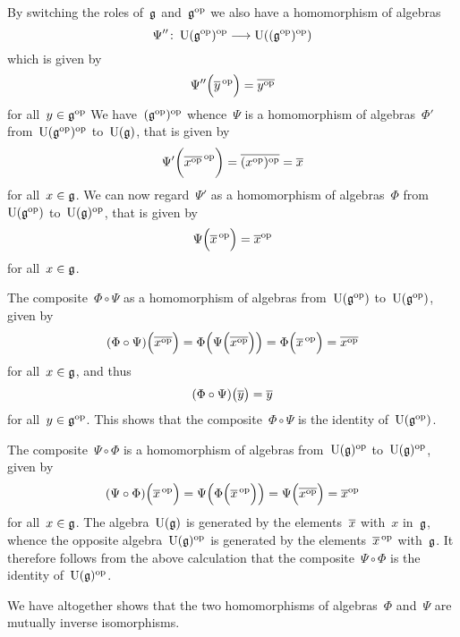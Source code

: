 \begin{example}
  By switching the roles of~$\mathfrak{g}$ and~$\mathfrak{g}^{\mathrm{op}}$ we also have a homomorphism of algebras
  \[
    \Psi''
    \colon
    \Univ(\glie^{\op})^{\op}
    \to
    \Univ( (\glie^{\op})^{\op} )
  \]
  which is given by
  \[
    \Psi''\Bigl( \overline{y}^{\,\mathrm{op}} \Bigr)
    =
    \overline{ y^{\mathrm{op}} }
  \]
  for all~$y \in \mathfrak{g}^{\mathrm{op}}$
  We have~$(\mathfrak{g}^{\mathrm{op}})^{\mathrm{op}}$ whence~$\Psi$ is a homomorphism of algebras~$\Phi'$ from~$\operatorname{U}(\mathfrak{g}^{\mathrm{op}})^{\mathrm{op}}$ to~$\operatorname{U}(\mathfrak{g})$, that is given by
  \[
    \Psi'\biggl( \overline{ x^{\mathrm{op}} }^{\,\mathrm{op}} \biggr)
    =
    \overline{ (x^{\mathrm{op}})^{\mathrm{op}} }
    =
    \overline{ x }
  \]
  for all~$x \in \mathfrak{g}$.
  We can now regard~$\Psi'$ as a homomorphism of algebras~$\Phi$ from~$\operatorname{U}(\mathfrak{g}^{\mathrm{op}})$ to~$\operatorname{U}(\mathfrak{g})^{\mathrm{op}}$, that is given by
  \[
    \Psi\Bigl( \overline{ x }^{\,\mathrm{op}} \Bigr)
    =
    \overline{ x }^{\mathrm{op}}
  \]
  for all~$x \in \mathfrak{g}$.

  The composite~$\Phi \circ \Psi$ as a homomorphism of algebras from~$\operatorname{U}( \mathfrak{g}^{\mathrm{op}} )$ to~$\operatorname{U}( \mathfrak{g}^{\mathrm{op}} )$, given by
  \[
    (\Phi \circ \Psi)\Bigl( \overline{ x^{\mathrm{op}} } \Bigr)
    =
    \Phi\Bigl( \Psi\Bigl( \overline{ x^{\mathrm{op}} }  \Bigr) \Bigr)
    =
    \Phi\Bigl( \overline{ x }^{\,\mathrm{op}} \Bigr)
    =
    \overline{ x^{\mathrm{op}} }
  \]
  for all~$x \in \mathfrak{g}$, and thus
  \[
    (\Phi \circ \Psi)\bigl( \overline{y} \bigr)
    =
    \overline{ y }
  \]
  for all~$y \in \mathfrak{g}^{\mathrm{op}}$.
  This shows that the composite~$\Phi \circ \Psi$ is the identity of~$\operatorname{U}( \mathfrak{g}^{\mathrm{op}} )$.

  The composite~$\Psi \circ \Phi$ is a homomorphism of algebras from~$\operatorname{U}( \mathfrak{g} )^{\mathrm{op}}$ to~$\operatorname{U}( \mathfrak{g} )^{\mathrm{op}}$, given by
  \[
    (\Psi \circ \Phi)\Bigl( \overline{x}^{\,\mathrm{op}} \Bigr)
    =
    \Psi\Bigl( \Phi\Bigl( \overline{x}^{\,\mathrm{op}} \Bigr) \Bigr)
    =
    \Psi\Bigl( \overline{ x^{\mathrm{op}} } \Bigr)
    =
    \overline{x}^{\mathrm{op}} 
  \]
  for all~$x \in \mathfrak{g}$.
  The algebra~$\operatorname{U}(\mathfrak{g})$ is generated by the elements~$\overline{x}$ with~$x$ in~$\mathfrak{g}$, whence the opposite algebra~$\operatorname{U}(\mathfrak{g})^{\mathrm{op}}$ is generated by the elements~$\overline{x}^{\,\mathrm{op}}$ with~$\mathfrak{g}$.
  It therefore follows from the above calculation that the composite~$\Psi \circ \Phi$ is the identity of~$\operatorname{U}( \mathfrak{g} )^{\mathrm{op}}$.

  We have altogether shows that the two homomorphisms of algebras~$\Phi$ and~$\Psi$ are mutually inverse isomorphisms.
\end{example}


